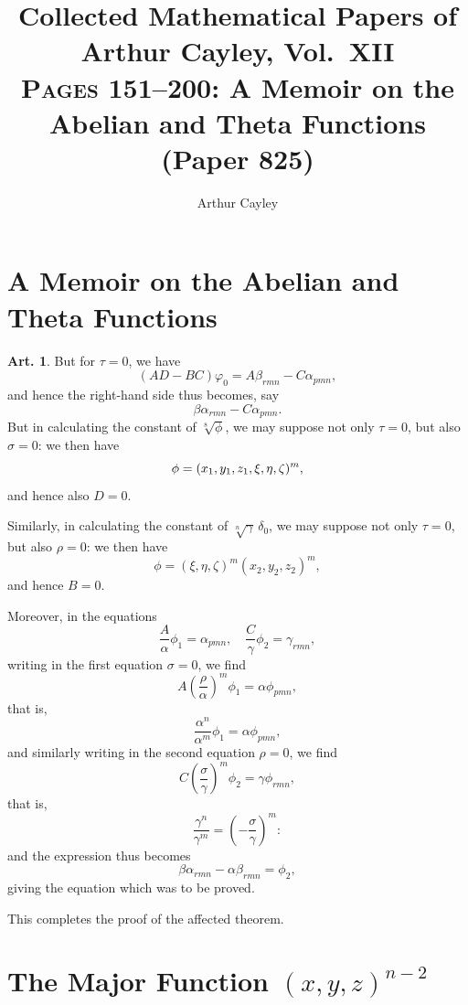 \documentclass[12pt,a4paper]{article}
\title{Collected Mathematical Papers of Arthur Cayley, Vol.~XII\\
\textsc{Pages 151--200}: A Memoir on the Abelian and Theta Functions (Paper 825)}
\author{Arthur Cayley}
\date{}
\theoremstyle{definition}
\newtheorem{art}{Art.}[section]
\begin{document}
\maketitle

\section*{A Memoir on the Abelian and Theta Functions}

\setcounter{page}{151}
\setcounter{section}{2}

\begin{art}\label{art:41}
But for $\tau = 0$, we have
\[
(AD - BC)\varphi_0 = A\beta_{rmn} - C\alpha_{pmn},
\]
and hence the right-hand side thus becomes, say
\[
\beta\alpha_{rmn} - C\alpha_{pmn}.
\]
But in calculating the constant of $\sqrt[8]{\phi}$, we may suppose not only $\tau = 0$, but also $\sigma = 0$: we then have
\[
\phi = (x_1, y_1, z_1 \char`\, \xi, \eta, \zeta)^m,
\]
and hence also $D = 0$.

Similarly, in calculating the constant of $\sqrt[n]{\gamma}\,\delta_0$, we may suppose not only $\tau = 0$, but also $\rho = 0$: we then have
\[
\phi = (\xi, \eta, \zeta)^m (x_2, y_2, z_2)^m,
\]
and hence $B = 0$.

Moreover, in the equations
\[
\frac{A}{\alpha}\phi_1 = \alpha_{pmn}, \quad \frac{C}{\gamma}\phi_2 = \gamma_{rmn},
\]
writing in the first equation $\sigma = 0$, we find
\[
A\left(\frac{\rho}{\alpha}\right)^m \phi_1 = \alpha\phi_{pmn},
\]
that is,
\[
\frac{\alpha^n}{\alpha^m}\phi_1 = \alpha\phi_{pmn},
\]
and similarly writing in the second equation $\rho = 0$, we find
\[
C\left(\frac{\sigma}{\gamma}\right)^m \phi_2 = \gamma\phi_{rmn},
\]
that is,
\[
\frac{\gamma^n}{\gamma^m} = \left(-\frac{\sigma}{\gamma}\right)^m:
\]
and the expression thus becomes
\[
\beta\alpha_{rmn} - \alpha\beta_{rmn} = \phi_2,
\]
giving the equation which was to be proved.

This completes the proof of the affected theorem.
\end{art}

\newpage
\section{The Major Function $(x, y, z)^{n-2}$}
\end{document}

